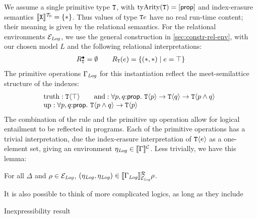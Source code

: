 We assume a single primitive type $\textup{\texttt{T}}$, with
$\mathrm{tyArity}(\textup{\texttt{T}}) = [\mathsf{prop}]$ and index-erasure
semantics $\llbracket \textup{\texttt{X}} \rrbracket^{\mathcal{T}_0} = \{ * \}$. Thus values of type
$\textup{\texttt{T}}{e}$ have no real run-time content; their meaning is
given by the relational semantics. For the relational environments
$\mathcal{E}_{\mathit{Log}}$, we use the general construction in
\autoref{sec:constr-rel-env}, with our chosen model $L$ and the
following relational interpretations:
\begin{displaymath}
  \begin{array}{l@{\hspace{2em}}l}
    R^\bullet_{\tyPrimNm{T}} = \emptyset &
    R_{\tyPrimNm{T}}(e) = \{ (*,*) \sepbar e = \top \}
  \end{array}
\end{displaymath}
The primitive operations $\Gamma_{\mathit{Log}}$ for this instantiation
reflect the meet-semilattice structure of the indexes:
\begin{displaymath}
  \begin{array}{l}
  \begin{array}{@{}c@{\hspace{2em}}c}
    \mathrm{truth} : \tyPrim{T}{\top} &
    \mathrm{and}   : \forall p, q\mathord:\mathsf{prop}.\ \tyPrim{T}{p} \to \tyPrim{T}{q} \to \tyPrim{T}{p \land q}
  \end{array} \\
  \mathrm{up} : \forall p, q\mathord:\mathsf{prop}.\ \tyPrim{T}{p \land q} \to \tyPrim{T}{p}
\end{array}
\end{displaymath}
The combination of the  rule and the primitive
$\mathrm{up}$ operation allow for logical entailment to be reflected
in programs. Each of the primitive operations has a trivial
interpretation, due the index-erasure interpretation of
$\textup{\texttt{T}}\langle e \rangle$ as a one-element set, giving an environment
$\eta_{\mathit{Log}} \in \llbracket \Gamma \rrbracket^{\mathcal{C}}$. Less trivially, we have this
lemma:
\begin{lemma}\label{lem:environments-information-flow}
  For all $\Delta$ and $\rho \in \mathcal{E}_{\mathit{Log}}$, $(\eta_{\mathit{Log}}, \eta_{\mathit{Log}}) \in \llbracket \Gamma_{\mathit{Log}} \rrbracket^{\mathcal{R}}_{\mathcal{E}_{\mathit{Log}}}{\rho}$.
\end{lemma}

It is also possible to think of more complicated logics, as long as
they include 

\begin{theorem}
  Inexpressibility result
\end{theorem}

